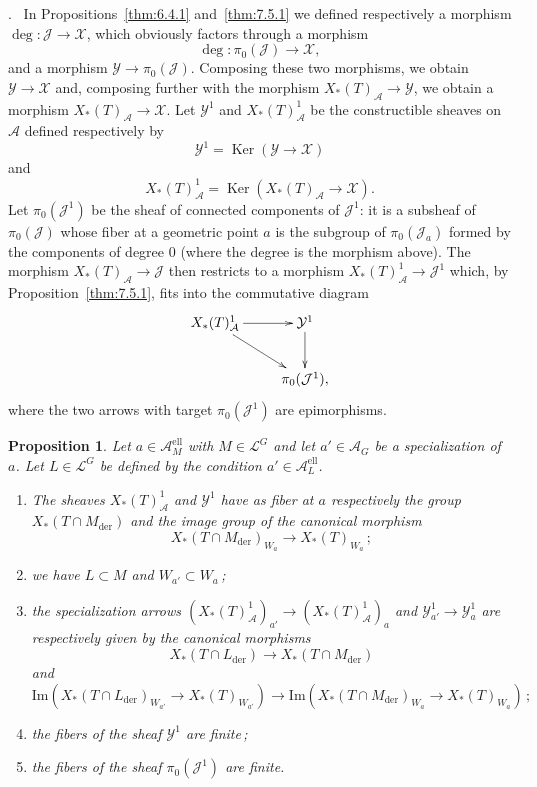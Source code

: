 \documentclass[12pt,a4paper,oneside,english,leqno]{smfart}
\makeatletter
\numberwithin{equation}{subsection}
\newcounter{theo}
\numberwithin{theo}{subsection}
\newenvironment{paragr}[1][]{\medskip\refstepcounter{subsection}%
  \par\noindent\hspace*{\parindent}\thesubsection.\ \emph{#1}%
  \@ifundefined{@empty}{}{}\ignorespaces}{\medskip}
\theoremstyle{plain}
\newtheorem{proposition}[theo]{Proposition}
\theoremstyle{definition}
\theoremstyle{remark}
\DeclareMathOperator{\der}{der}
\DeclareMathOperator{\el}{ell}
\DeclareMathOperator{\Ker}{Ker}
\newcommand{\yc}{\mathcal{Y}}
\newcommand{\lc}{\mathcal{L}}
\newcommand{\Ac}{\mathcal{A}}
\newcommand{\Jc}{\mathcal{J}}
\newcommand{\xc}{\mathcal{X}}
\makeatother
\begin{document}
\begin{paragr}\label{S:8.3}
In Propositions~\ref{thm:6.4.1} and~\ref{thm:7.5.1} we defined respectively a morphism $\deg:\Jc\to\xc$, which obviously factors through a morphism
$$
\deg:\pi_0(\Jc)\to\xc,
$$
and a morphism $\yc\to\pi_0(\Jc)$. Composing these two morphisms, we obtain $\yc\to\xc$ and, composing further with the morphism $X_*(T)_{\Ac}\to\yc$, we obtain a morphism $X_*(T)_{\Ac}\to\xc$. Let $\yc^1$ and $X_*(T)^1_{\Ac}$ be the constructible sheaves on $\Ac$ defined respectively by
$$
\yc^1=\Ker(\yc\to\xc)
$$
and
$$
X_*(T)^1_{\Ac}=\Ker(X_*(T)_{\Ac}\to\xc).
$$
Let $\pi_0(\Jc^1)$ be the sheaf of connected components of $\Jc^1$: it is a subsheaf of $\pi_0(\Jc)$ whose fiber at a geometric point $a$ is the subgroup of $\pi_0(\Jc_a)$ formed by the components of degree $0$ (where the degree is the morphism above). The morphism $X_*(T)_{\Ac}\to\Jc$ then restricts to a morphism $X_*(T)^1_{\Ac}\to\Jc^1$ which, by Proposition~\ref{thm:7.5.1}, fits into the commutative diagram
\begin{equation}\label{eq:8.3.1}
\xymatrix{
X_*(T)^1_{\Ac}\ar[r]\ar[dr] & \yc^1\ar[d]\\
& \pi_0(\Jc^1),
}
\end{equation}
where the two arrows with target $\pi_0(\Jc^1)$ are epimorphisms.

\begin{proposition}\label{thm:8.3.1}
Let $a\in\Ac_M^{\el}$ with $M\in\lc^G$ and let $a'\in\Ac_G$ be a specialization of $a$. Let $L\in\lc^G$ be defined by the condition $a'\in\Ac_L^{\el}$.
\begin{enumerate}
\item The sheaves $X_*(T)^1_{\Ac}$ and $\yc^1$ have as fiber at $a$ respectively the group $X_*(T\cap M_{\der})$ and the image group of the canonical morphism
$$
X_*(T\cap M_{\der})_{W_a}\to X_*(T)_{W_a}\,;
$$
\item we have $L\subset M$ and $W_{a'}\subset W_a$\,; \item the specialization arrows $(X_*(T)^1_{\Ac})_{a'}\to(X_*(T)^1_{\Ac})_a$ and $\yc^1_{a'}\to\yc^1_a$ are respectively given by the canonical morphisms
$$
X_*(T\cap L_{\der})\to X_*(T\cap M_{\der})
$$
and
$$
\mathrm{Im}(X_*(T\cap L_{\der})_{W_{a'}}\to X_*(T)_{W_{a'}})\to\mathrm{Im}(X_*(T\cap M_{\der})_{W_a}\to X_*(T)_{W_a})\,;
$$
\item the fibers of the sheaf $\yc^1$ are finite\,; \item the fibers of the sheaf $\pi_0(\Jc^1)$ are finite.
\end{enumerate}
\end{proposition}


\end{paragr}
\end{document}
